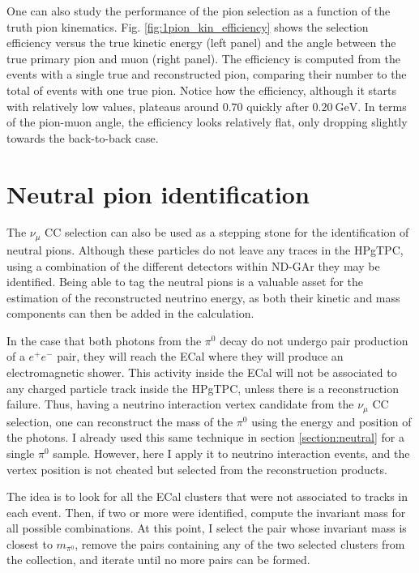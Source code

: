 One can also study the performance of the pion selection as a function of the truth pion kinematics. Fig. \ref{fig:1pion_kin_efficiency} shows the selection efficiency versus the true kinetic energy (left panel) and the angle between the true primary pion and muon (right panel). The efficiency is computed from the events with a single true and reconstructed pion, comparing their number to the total of events with one true pion. Notice how the efficiency, although it starts with relatively low values, plateaus around $0.70$ quickly after $0.20~\mathrm{GeV}$. In terms of the pion-muon angle, the efficiency looks relatively flat, only dropping slightly towards the back-to-back case.

\section{Neutral pion identification}
\label{sec:gar_neutral_pions}

The $\nu_{\mu}$ CC selection can also be used as a stepping stone for the identification of neutral pions. Although these particles do not leave any traces in the HPgTPC, using a combination of the different detectors within ND-GAr they may be identified. Being able to tag the neutral pions is a valuable asset for the estimation of the reconstructed neutrino energy, as both their kinetic and mass components can then be added in the calculation.

In the case that both photons from the $\pi^{0}$ decay do not undergo pair production of a $e^{+}e^{-}$ pair, they will reach the ECal where they will produce an electromagnetic shower. This activity inside the ECal will not be associated to any charged particle track inside the HPgTPC, unless there is a reconstruction failure. Thus, having a neutrino interaction vertex candidate from the $\nu_{\mu}$ CC selection, one can reconstruct the mass of the $\pi^{0}$ using the energy and position of the photons. I already used this same technique in section \ref{section:neutral} for a single $\pi^{0}$ sample. However, here I apply it to neutrino interaction events, and the vertex position is not cheated but selected from the reconstruction products.

The idea is to look for all the ECal clusters that were not associated to tracks in each event. Then, if two or more were identified, compute the invariant mass for all possible combinations. At this point, I select the pair whose invariant mass is closest to $m_{\pi^{0}}$, remove the pairs containing any of the two selected clusters from the collection, and iterate until no more pairs can be formed.

